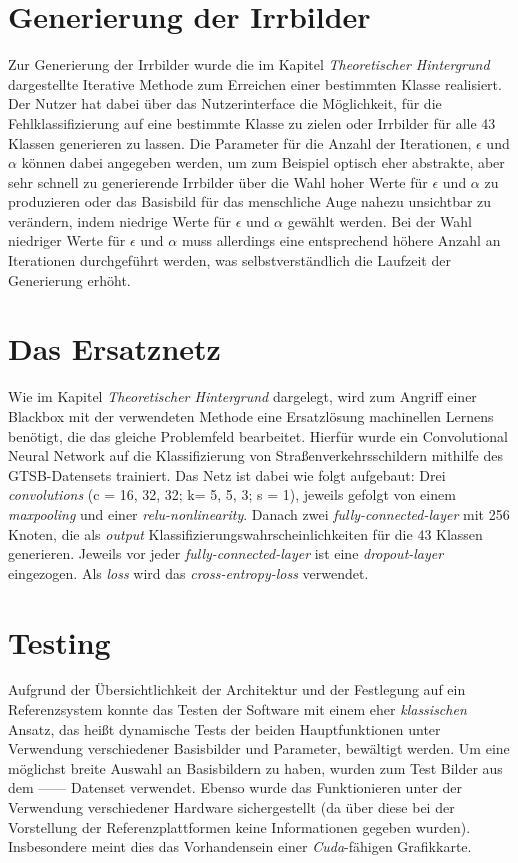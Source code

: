 \section{Generierung der Irrbilder}

Zur Generierung der Irrbilder wurde die im Kapitel \textit{Theoretischer Hintergrund} dargestellte Iterative Methode zum Erreichen einer bestimmten Klasse realisiert. Der Nutzer hat dabei über das Nutzerinterface die Möglichkeit, für die Fehlklassifizierung auf eine bestimmte Klasse zu zielen oder Irrbilder für alle 43 Klassen generieren zu lassen. Die Parameter für die Anzahl der Iterationen, \(\epsilon \) und \(\alpha \) können dabei angegeben werden, um zum Beispiel optisch eher abstrakte, aber sehr schnell zu generierende Irrbilder über die Wahl hoher Werte für \( \epsilon \) und \( \alpha \) zu produzieren oder das Basisbild für das menschliche Auge nahezu unsichtbar zu verändern, indem niedrige Werte für \(\epsilon \) und \(\alpha \) gewählt werden. Bei der Wahl niedriger Werte für \(\epsilon \) und \(\alpha \) muss allerdings eine entsprechend höhere Anzahl an Iterationen durchgeführt werden, was selbstverständlich die Laufzeit der Generierung erhöht.

\section{Das Ersatznetz}

Wie im Kapitel \textit{Theoretischer Hintergrund} dargelegt, wird zum Angriff einer Blackbox mit der verwendeten Methode eine Ersatzlösung machinellen Lernens benötigt, die das gleiche Problemfeld bearbeitet. Hierfür wurde ein Convolutional Neural Network auf die Klassifizierung von Straßenverkehrsschildern mithilfe des GTSB-Datensets trainiert. Das Netz ist dabei wie folgt aufgebaut:
Drei \textit{convolutions} (c = 16, 32, 32; k= 5, 5, 3; s = 1), jeweils gefolgt von einem \textit{maxpooling} und einer \textit{relu-nonlinearity}. Danach zwei \textit{fully-connected-layer} mit 256 Knoten, die als \textit{output} Klassifizierungswahrscheinlichkeiten für die 43 Klassen generieren. Jeweils vor jeder \textit{fully-connected-layer} ist eine \textit{dropout-layer} eingezogen. Als \textit{loss} wird das \textit{cross-entropy-loss} verwendet.

\section{Testing}
 
Aufgrund der Übersichtlichkeit der Architektur und der Festlegung auf ein Referenzsystem konnte das Testen der Software mit einem eher \textit{klassischen} Ansatz, das heißt dynamische Tests der beiden Hauptfunktionen unter Verwendung verschiedener Basisbilder und Parameter, bewältigt werden. Um eine möglichst breite Auswahl an Basisbildern zu haben, wurden zum Test Bilder aus dem ------ Datenset verwendet.
Ebenso wurde das Funktionieren unter der Verwendung verschiedener Hardware sichergestellt (da über diese bei der Vorstellung der Referenzplattformen keine Informationen gegeben wurden). Insbesondere meint dies das Vorhandensein einer \textit{Cuda}-fähigen Grafikkarte.

